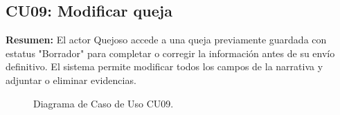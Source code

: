 \begin{appendices}
\newpage

\subsection{CU09: Modificar queja}

\textbf{Resumen:} 
El actor Quejoso accede a una queja previamente guardada con estatus "Borrador" para completar o corregir la información antes de su envío definitivo. El sistema permite modificar todos los campos de la narrativa y adjuntar o eliminar evidencias.

\begin{figure}[htbp]
    \centering
    \figCUnueve
    \caption{Diagrama de Caso de Uso CU09.}
    \label{fig:cu09}
\end{figure}


\end{appendices}
